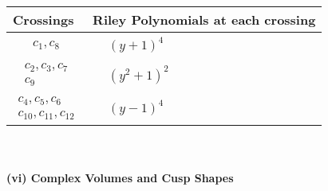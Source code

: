 \documentclass[1p]{elsarticle_modified}
\theoremstyle{definition}
\begin{document}
\begin{tabular}{m{50pt}|m{274pt}}
Crossings & \hspace{64pt}Riley Polynomials at each crossing \\
\hline $$\begin{aligned}c_{1},c_{8}\end{aligned}$$&$\begin{aligned}
&(y+1)^4
\end{aligned}$\\
\hline $$\begin{aligned}c_{2},c_{3},c_{7}\\c_{9}\end{aligned}$$&$\begin{aligned}
&(y^2+1)^2
\end{aligned}$\\
\hline $$\begin{aligned}c_{4},c_{5},c_{6}\\c_{10},c_{11},c_{12}\end{aligned}$$&$\begin{aligned}
&(y-1)^4
\end{aligned}$\\
\hline
\end{tabular}\\~\\
\newpage\flushleft \textbf{(vi) Complex Volumes and Cusp Shapes}
\end{document}
